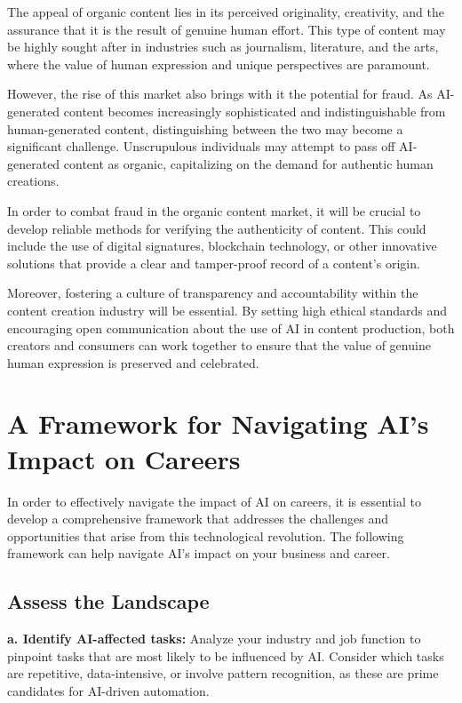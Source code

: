 The appeal of organic content lies in its perceived originality, creativity, and the assurance that it is the result of genuine human effort. This type of content may be highly sought after in industries such as journalism, literature, and the arts, where the value of human expression and unique perspectives are paramount.

However, the rise of this market also brings with it the potential for fraud. As AI-generated content becomes increasingly sophisticated and indistinguishable from human-generated content, distinguishing between the two may become a significant challenge. Unscrupulous individuals may attempt to pass off AI-generated content as organic, capitalizing on the demand for authentic human creations.

In order to combat fraud in the organic content market, it will be crucial to develop reliable methods for verifying the authenticity of content. This could include the use of digital signatures, blockchain technology, or other innovative solutions that provide a clear and tamper-proof record of a content's origin.

Moreover, fostering a culture of transparency and accountability within the content creation industry will be essential. By setting high ethical standards and encouraging open communication about the use of AI in content production, both creators and consumers can work together to ensure that the value of genuine human expression is preserved and celebrated.

\section{A Framework for Navigating AI's Impact on Careers}

In order to effectively navigate the impact of AI on careers, it is essential to develop a comprehensive framework that addresses the challenges and opportunities that arise from this technological revolution. The following framework can help navigate AI's impact on your business and career.

\subsection{Assess the Landscape}

\textbf{a. Identify AI-affected tasks:} Analyze your industry and job function to pinpoint tasks that are most likely to be influenced by AI. Consider which tasks are repetitive, data-intensive, or involve pattern recognition, as these are prime candidates for AI-driven automation.

